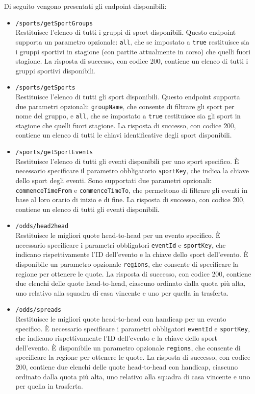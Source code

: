 Di seguito vengono presentati gli endpoint disponibili:
\begin{itemize}
    \item \texttt{/sports/getSportGroups}\\
    Restituisce l'elenco di tutti i gruppi di sport disponibili. Questo endpoint supporta un parametro opzionale: \texttt{all}, che se impostato a \texttt{true} restituisce sia i gruppi sportivi in stagione (con partite attualmente in corso) che quelli fuori stagione. La risposta di successo, con codice 200, contiene un elenco di tutti i gruppi sportivi disponibili.
    \item \texttt{/sports/getSports}\\
    Restituisce l'elenco di tutti gli sport disponibili. Questo endpoint supporta due parametri opzionali: \texttt{groupName}, che consente di filtrare gli sport per nome del gruppo, e \texttt{all}, che se impostato a \texttt{true} restituisce sia gli sport in stagione che quelli fuori stagione. La risposta di successo, con codice 200, contiene un elenco di tutti le chiavi identificative degli sport disponibili.
    \item \texttt{/sports/getSportEvents}\\
    Restituisce l'elenco di tutti gli eventi disponibili per uno sport specifico. È necessario specificare il parametro obbligatorio \texttt{sportKey}, che indica la chiave dello sport degli eventi. Sono supportati due parametri opzionali: \texttt{commenceTimeFrom} e \texttt{commenceTimeTo}, che permettono di filtrare gli eventi in base al loro orario di inizio e di fine. La risposta di successo, con codice 200, contiene un elenco di tutti gli eventi disponibili.
    \item \texttt{/odds/head2head}\\
    Restituisce le migliori quote head-to-head per un evento specifico. È necessario specificare i parametri obbligatori \texttt{eventId} e \texttt{sportKey}, che indicano rispettivamente l'ID dell'evento e la chiave dello sport dell'evento. È disponibile un parametro opzionale \texttt{regions}, che consente di specificare la regione per ottenere le quote. La risposta di successo, con codice 200, contiene due elenchi delle quote head-to-head, ciascuno ordinato dalla quota più alta, uno relativo alla squadra di casa vincente e uno per quella in trasferta.
    \item \texttt{/odds/spreads}\\
    Restituisce le migliori quote head-to-head con handicap per un evento specifico. È necessario specificare i parametri obbligatori \texttt{eventId} e \texttt{sportKey}, che indicano rispettivamente l'ID dell'evento e la chiave dello sport dell'evento. È disponibile un parametro opzionale \texttt{regions}, che consente di specificare la regione per ottenere le quote. La risposta di successo, con codice 200, contiene due elenchi delle quote head-to-head con handicap, ciascuno ordinato dalla quota più alta, uno relativo alla squadra di casa vincente e uno per quella in trasferta.
\end{itemize}


